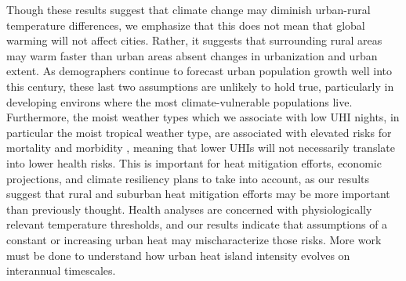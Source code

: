 Though these results suggest that climate change may diminish urban-rural temperature differences, 
we emphasize that this does not mean that global warming will not affect cities. 
Rather, it suggests that surrounding rural areas may warm faster than urban areas absent changes in urbanization and urban extent. As demographers continue to forecast urban population growth well into this century, these last two assumptions are unlikely to hold true, particularly in developing environs where the most  climate-vulnerable populations live. 
Furthermore, the moist weather types which we associate with low UHI nights, in particular the moist tropical weather type, are associated with elevated risks for mortality and morbidity  \citep{sheridan2004progress}, meaning that lower UHIs will not necessarily translate into lower health risks. 
This is important for heat mitigation efforts, economic projections, and climate resiliency plans to take into account, as our results suggest that rural and suburban heat mitigation efforts may be more important than previously thought. Health analyses are concerned with physiologically relevant temperature thresholds, and our results indicate that assumptions of a constant or increasing urban heat may mischaracterize those risks. 
More work must be done to understand how urban heat island intensity evolves on interannual timescales. 


